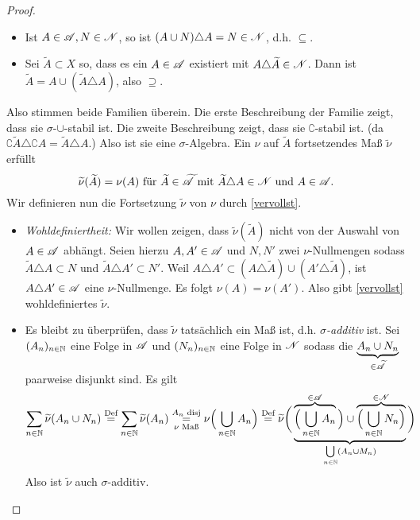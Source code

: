 \begin{proposition}
\begin{proof}\
\begin{itemize}[itemsep=0pt,topsep=3pt]
\item Ist $A\in \AA, N \in \NN$, so ist $(A \cup N) \triangle A = N\in \NN$, d.h. $\subseteq$.
\item Sei $\widetilde{A}\subset X$ so, dass es ein $A \in \AA$ existiert mit $A \triangle \widetilde{A} \in \NN$. Dann ist $\widetilde{A}= A \cup (\widetilde{A} \triangle A)$, also $\supseteq$.
\end{itemize}
Also stimmen beide Familien überein. Die erste Beschreibung der Familie zeigt, dass sie $\sigma$-$\cup$-stabil ist. Die zweite Beschreibung zeigt, dass sie $\complement$-stabil ist. (da $\complement \widetilde{A} \triangle \complement A  = \widetilde{A} \triangle A$.) Also ist sie eine $\sigma$-Algebra. Ein $\nu$ auf $\widetilde{A}$ fortsetzendes Maß $\widetilde{\nu}$ erfüllt
\begin{equation}\label{vervollst}
\widetilde{\nu}(\widetilde{A})=\nu(A) \text{ für } \widetilde{A} \in \widetilde{\AA} \text{ mit } \widetilde{A}\triangle A \in \NN \text{ und } A \in \AA.
\end{equation}
Wir definieren nun die Fortsetzung $\widetilde{\nu}$ von $\nu$ durch \eqref{vervollst}.
\begin{itemize}[itemsep=0pt,topsep=3pt]
\item
\emph{Wohldefiniertheit:} Wir wollen zeigen, dass $\widetilde{\nu}(\widetilde{A})$ nicht von der Auswahl von $A\in \AA$ abhängt. Seien hierzu $A,A' \in \AA$ und $N,N'$ zwei $\nu$-Nullmengen sodass $\widetilde{A} \triangle A \subset N$ und $\widetilde{A} \triangle A' \subset N'$. Weil $A \triangle A' \subset (A \triangle \widetilde{A}) \cup (A' \triangle \widetilde{A})$, ist $A \triangle A' \in \AA$ eine $\nu$-Nullmenge. Es folgt $\nu(A)=\nu(A')$. Also gibt \eqref{vervollst} wohldefiniertes $\widetilde{\nu}$.
\item Es bleibt zu überprüfen, dass $\widetilde{\nu}$ tatsächlich ein Maß ist, d.h. \emph{$\sigma$-additiv} ist. Sei $(A_n)_{n \in \N}$ eine Folge in $\AA$ und $(N_n)_{n\in\N}$ eine Folge in $\NN$ sodass die $\underbrace{A_n \cup N_n}_{\in \widetilde{\AA}}$ paarweise disjunkt sind. Es gilt
$$
\sum_{n \in \N} \widetilde{\nu}(A_n \cup N_n) \overset{\text{Def}}= \sum_{n \in \N} \widetilde\nu (A_n) \underset{\nu \text{ Maß}}{\overset{A_n \text{ disj}}=} \nu\Big(\bigcup_{n\in\N} A_n\Big) \overset{\text{Def}}= \widetilde{\nu} \bigg( \underbrace{ \overbrace{\Big( \bigcup_{n\in \N}A_n}^{\in \AA} \Big) \cup \overbrace{\Big(\bigcup_{n\in\N} N_n \Big)}^{\in \NN}}_{\bigcup\limits_{n\in\N}(A_n \cup M_n)} \bigg)
$$
Also ist $\widetilde{\nu}$ auch $\sigma$-additiv.
\end{itemize}
\end{proof}
\end{proposition}

